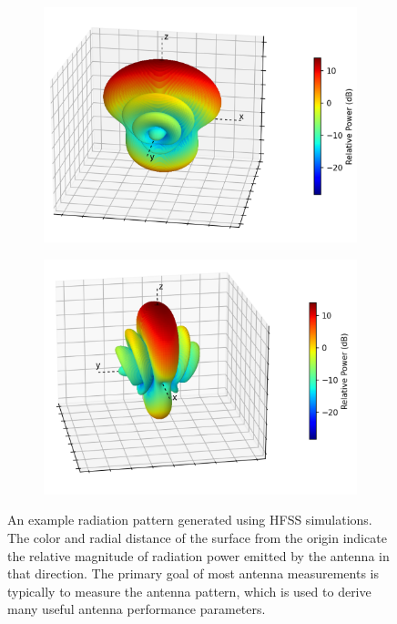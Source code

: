\begin{figure}[htbp]
    \centering
    \begin{subfigure}[b]{0.48\textwidth}
        \centering
        \includegraphics[width=1\textwidth]{figs/Chapter-5/230419_example_radiation_pattern2.png}
        \caption{\label{fig:rad-pattern-ex1}}
    \end{subfigure}
    \hfill
    \begin{subfigure}[b]{0.48\textwidth}
        \centering
        \includegraphics[width=1\textwidth]{figs/Chapter-5/230419_example_radiation_pattern.png}
        \caption{\label{fig:rad-pattern-ex2}}
    \end{subfigure}
    \hfill
    \caption{An example radiation pattern generated using HFSS simulations. The color and radial distance of the surface from the origin indicate the relative magnitude of radiation power emitted by the antenna in that direction. The primary goal of most antenna measurements is typically to measure the antenna pattern, which is used to derive many useful antenna performance parameters.}
    \qquad
    \label{fig:rad-pattern-examples}
\end{figure}

